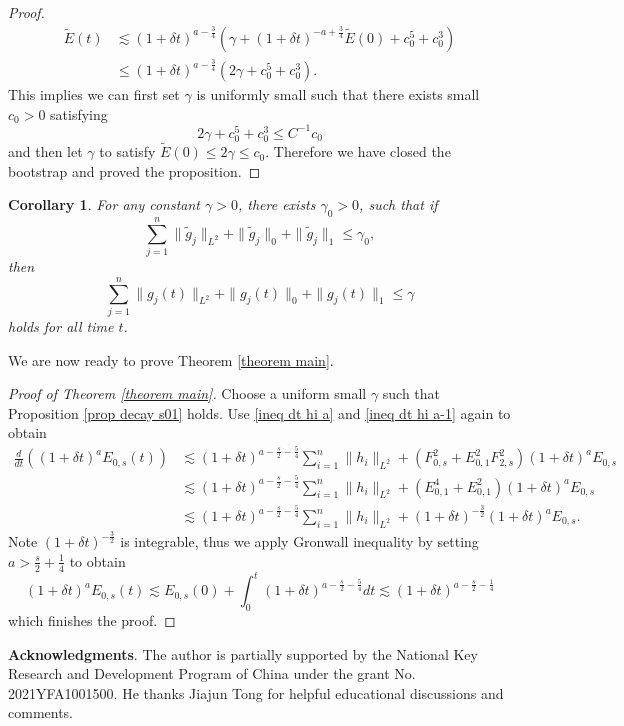 \documentclass[11pt]{article}
\newcommand{\TE}{\tilde{E}}
\newtheorem{corollary}{Corollary}[section]
\theoremstyle{definition}
\numberwithin{equation}{section}
\begin{document}
\begin{proof}
    \begin{align}
         \TE(t)&\lesssim(1+\delta t)^{a-\frac{3}{4}}\left(\gamma+(1+\delta t)^{-a+\frac{3}{4}}\TE(0)+c_0^5+c_0^3\right)\\
        &\leq (1+\delta t)^{a-\frac{3}{4}}(2\gamma+c_0^5+c_0^3).
    \end{align}
    This implies we can first set $\gamma$ is uniformly small such that there exists small $c_0>0$ satisfying 
\begin{equation}
    2\gamma+c_0^5+c_0^3\leq C^{-1} c_0
\end{equation}
   and then let $\gamma$ to satisfy $\TE(0)\leq2\gamma\leq c_0$. Therefore we have closed the bootstrap and proved the proposition.
\end{proof}

\begin{corollary}
    For any constant $\gamma>0$, there exists $\gamma_0>0$, such that if
    \begin{equation}
        \sum_{j=1}^n\|\tilde{g}_j\|_{L^2}+\|\tilde{g}_j\|_0+\|\tilde{g}_j\|_1\leq \gamma_0,
    \end{equation}
    then
    \begin{equation}
        \sum_{j=1}^n\|g_j(t)\|_{L^2}+\|g_j(t)\|_0+\|g_j(t)\|_1\leq \gamma
    \end{equation}
    holds for all time $t$.
\end{corollary}
We are now ready to prove Theorem \ref{theorem main}.
\begin{proof}[Proof of Theorem \ref{theorem main}]
    Choose a uniform small $\gamma$ such that Proposition \ref{prop decay s01} holds. Use \eqref{ineq dt hi a} and \eqref{ineq dt hi a-1} again to obtain
    \begin{align}
        \frac{d}{dt}\left((1+\delta t)^aE_{0,s}(t)\right)
        &\lesssim (1+\delta t)^{a-\frac{s}{2}-\frac{5}{4}}\sum_{i=1}^n\|h_i\|_{L^2}+\left(F_{0,s}^2+E_{0,1}^2F_{2,s}^2\right)(1+\delta t)^aE_{0,s}\\
        &\lesssim (1+\delta t)^{a-\frac{s}{2}-\frac{5}{4}}\sum_{i=1}^n\|h_i\|_{L^2}+\left(E_{0,1}^4+E_{0,1}^2\right)(1+\delta t)^aE_{0,s}\\
        &\lesssim (1+\delta t)^{a-\frac{s}{2}-\frac{5}{4}}\sum_{i=1}^n\|h_i\|_{L^2}+(1+\delta t)^{-\frac{3}{2}}(1+\delta t)^aE_{0,s}.
    \end{align}
   Note $(1+\delta t)^{-\frac{3}{2}}$ is integrable, thus we apply Gronwall inequality by setting $a>\frac{s}{2}+\frac{1}{4}$ to obtain
   \begin{equation}
       (1+\delta t)^aE_{0,s}(t)\lesssim E_{0,s}(0)+\int_0^t(1+\delta t)^{a-\frac{s}{2}-\frac{5}{4}}dt\lesssim (1+\delta t)^{a-\frac{s}{2}-\frac{1}{4}}
   \end{equation}
which finishes the proof.
\end{proof}

\vspace{0.2in}
\noindent
{\bf Acknowledgments}. The author is partially supported by the National Key Research and Development Program of China under the grant No. 2021YFA1001500. He thanks Jiajun Tong for helpful educational discussions and comments.
\end{document}
